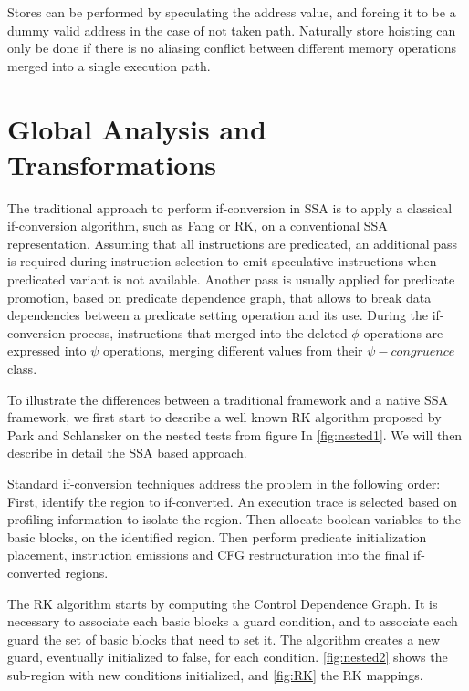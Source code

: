 Stores can be performed by speculating the address value, and forcing it to be a dummy valid address in the case of not taken path. Naturally store hoisting can only be done if there is no aliasing conflict between different memory operations merged into a single execution path. 

\section{Global Analysis and Transformations}

The traditional approach to perform if-conversion in SSA is to apply a classical if-conversion algorithm, such as Fang or RK, on a conventional SSA representation. Assuming that all instructions are predicated, an additional pass is required during instruction selection to emit speculative instructions when predicated variant is not available. Another pass is usually applied for predicate promotion, based on predicate dependence graph, that allows to break data dependencies between a predicate setting operation and its use.
During the if-conversion process, instructions that merged into the deleted $\phi$ operations are expressed into $\psi$ operations, merging different values from their $\psi-congruence$ class. 

To illustrate the differences between a traditional framework and a native SSA framework, we first start to describe a well known RK algorithm proposed by Park and Schlansker on the nested tests from figure In \ref{fig:nested1}. We will then describe in detail the SSA based approach.

Standard if-conversion techniques address the problem in the following order: First, identify the region to if-converted. An execution trace is selected based on profiling information to isolate the region. Then allocate boolean variables to the basic blocks, on the identified region. Then perform predicate initialization placement, instruction emissions and CFG restructuration into the final if-converted regions.

The RK algorithm starts by computing the Control Dependence Graph. It is necessary to associate each basic blocks a guard condition, and to associate each guard the set of basic blocks that need to set it. The algorithm creates a new guard, eventually initialized to false, for each condition. \ref{fig:nested2} shows the sub-region with new conditions initialized, and \ref{fig:RK} the RK mappings.

